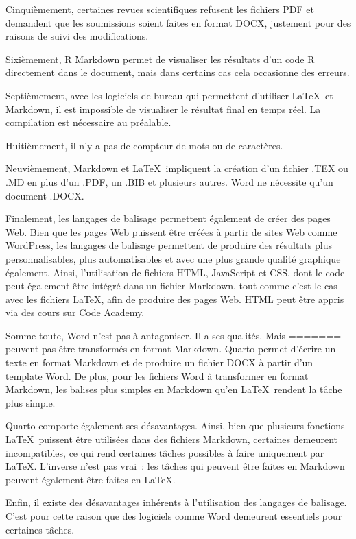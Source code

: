 \documentclass[
  letterpaper,
]{scrbook}
\begin{document}
Cinquièmement, certaines revues scientifiques refusent les fichiers PDF
et demandent que les soumissions soient faites en format DOCX, justement
pour des raisons de suivi des modifications.

Sixièmement, R Markdown permet de visualiser les résultats d'un code R
directement dans le document, mais dans certains cas cela occasionne des
erreurs.

Septièmement, avec les logiciels de bureau qui permettent d'utiliser
\LaTeX~et Markdown, il est impossible de visualiser le résultat final en
temps réel. La compilation est nécessaire au préalable.

Huitièmement, il n'y a pas de compteur de mots ou de caractères.

Neuvièmement, Markdown et \LaTeX~impliquent la création d'un fichier
.TEX ou .MD en plus d'un .PDF, un .BIB et plusieurs autres. Word ne
nécessite qu'un document .DOCX.

Finalement, les langages de balisage permettent également de créer des
pages Web. Bien que les pages Web puissent être créées à partir de sites
Web comme WordPress, les langages de balisage permettent de produire des
résultats plus personnalisables, plus automatisables et avec une plus
grande qualité graphique également. Ainsi, l'utilisation de fichiers
HTML, JavaScript et CSS, dont le code peut également être intégré dans
un fichier Markdown, tout comme c'est le cas avec les fichiers \LaTeX,
afin de produire des pages Web. HTML peut être appris via des cours sur
Code Academy.

Somme toute, Word n'est pas à antagoniser. Il a ses qualités. Mais
=======
peuvent pas être transformés en format Markdown. Quarto permet d'écrire
un texte en format Markdown et de produire un fichier DOCX à partir d'un
template Word. De plus, pour les fichiers Word à transformer en format
Markdown, les balises plus simples en Markdown qu'en \LaTeX~rendent la
tâche plus simple.

Quarto comporte également ses désavantages. Ainsi, bien que plusieurs
fonctions \LaTeX~puissent être utilisées dans des fichiers Markdown,
certaines demeurent incompatibles, ce qui rend certaines tâches
possibles à faire uniquement par \LaTeX. L'inverse n'est pas vrai~: les
tâches qui peuvent être faites en Markdown peuvent également être faites
en \LaTeX.

Enfin, il existe des désavantages inhérents à l'utilisation des langages
de balisage. C'est pour cette raison que des logiciels comme Word
demeurent essentiels pour certaines tâches.
\end{document}
